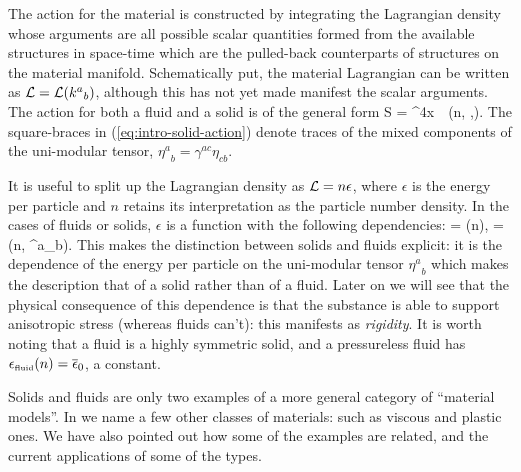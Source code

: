 The action for the material is constructed by integrating the Lagrangian density whose arguments are all possible scalar quantities formed from the available structures in space-time which are the pulled-back counterparts of structures on the material manifold. Schematically put, the material Lagrangian can be written as $\mathcal{L} = \mathcal{L}({k^a}_b)$, although this has not yet made manifest the scalar arguments.
The action for both a fluid and a solid is of the general form 
\bea
\label{eq:intro-solid-action}
S = \int \dd^4x\, \, \ld\left(n, \left[ \gbm{\eta}\right],\left[\gbm{\eta}^2\right]\right).
\eea
The square-braces in (\ref{eq:intro-solid-action}) denote traces of the mixed components of the uni-modular tensor, ${\eta^a}_b = \gamma^{ac}\eta_{cb}$. 

It is useful to split up the Lagrangian density   as $\mathcal{L} = n \epsilon$, where $\epsilon$ is the energy per particle and $n$ retains its interpretation as the particle number density. In the  cases of   fluids or solids, $\epsilon$ is a function with the following dependencies:
\bea
{} = (n),\qquad {} = (n, {\eta^a}_b).
\eea
This makes the distinction between solids and fluids explicit: it is the dependence of the energy per particle on the uni-modular tensor ${\eta^a}_b$ which makes the description that of a solid rather than of a fluid. Later on we will see that the physical consequence of this dependence is that the substance is able to support anisotropic stress (whereas fluids can't): this manifests as \textit{rigidity}. It is worth noting that a fluid is a highly symmetric solid, and a pressureless fluid has ${\epsilon}_{\scriptscriptstyle{\textrm{fluid}}}(n) = \overline{\epsilon}_0$, a constant.

Solids and fluids are only two examples of a more general category of ``material models''. In  we name a few other classes of materials: such as viscous and plastic ones. We have also pointed out how some of the examples are related, and the current applications of some of the types.



